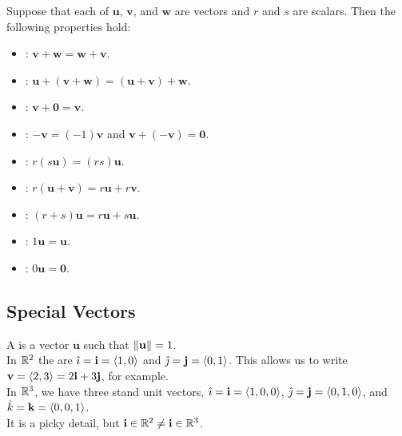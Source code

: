 Suppose that each of \(\mathbf{u}\), \(\mathbf{v}\), and \(\mathbf{w}\) are vectors and \(r\) and \(s\) are scalars. Then the following properties hold:
\begin{itemize}
    \item {}: \(\mathbf{v} + \mathbf{w} = \mathbf{w} + \mathbf{v}\).
    \item {}: \(\mathbf{u} + (\mathbf{v} + \mathbf{w}) = (\mathbf{u} + \mathbf{v}) + \mathbf{w}\).
    \item {}: \(\mathbf{v} + \mathbf{0} = \mathbf{v}\).
    \item {}: \(-\mathbf{v} = (-1)\mathbf{v}\) and \(\mathbf{v} + (-\mathbf{v}) = \mathbf{0}\).
    \item {}: \(r(s\mathbf{u})= (rs)\mathbf{u}\).
    \item {}: \(r(\mathbf{u} + \mathbf{v}) = r\mathbf{u} + r\mathbf{v}\).
    \item {}: \((r+s)\mathbf{u} = r\mathbf{u} + s\mathbf{u}\).
    \item {}: \(1\mathbf{u} = \mathbf{u}\).
    \item {}: \(0\mathbf{u} = \mathbf{0}\).
\end{itemize}

\subsection{Special Vectors}

A  is a vector \(\mathbf{u}\) such that \(\left\lVert \mathbf{u}\right\rVert = 1\). \\

In \(\mathbb{R}^{2}\) the  are \(\hat{\imath} = \mathbf{i} = \langle 1,0 \rangle\) and \(\hat{\jmath} = \mathbf{j} = \langle 0,1 \rangle\). This allows us to write \(\mathbf{v} = \langle 2,3 \rangle = 2\mathbf{i} + 3\mathbf{j}\), for example. \\

In \(\mathbb{R}^{3}\), we have three stand unit vectors, \(\hat{\imath} = \mathbf{i} = \langle 1,0,0 \rangle\), \(\hat{\jmath} = \mathbf{j} = \langle 0,1,0 \rangle\), and \(\hat{k} = \mathbf{k} = \langle 0,0,1 \rangle\).  \\

It is a picky detail, but \(\mathbf{i} \in \mathbb{R}^{2} \ne \mathbf{i} \in \mathbb{R}^{3}\). 
